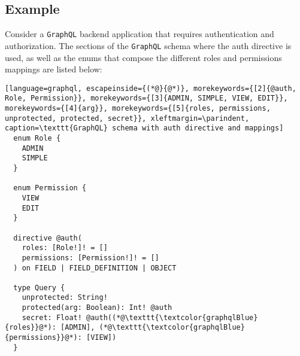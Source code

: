 \subsection{Example}
\label{subsec:corollary_projects_graphql_auth_diretive_example}

Consider a \texttt{GraphQL} backend application that requires authentication and
authorization. The sections of the \texttt{GraphQL} schema where the auth
directive is used, as well as the enums that compose the different roles and permissions
mappings are listed below:

\begin{lstlisting}[language=graphql, escapeinside={(*@}{@*)}, morekeywords={[2]{@auth, Role, Permission}}, morekeywords={[3]{ADMIN, SIMPLE, VIEW, EDIT}}, morekeywords={[4]{arg}}, morekeywords={[5]{roles, permissions, unprotected, protected, secret}}, xleftmargin=\parindent, caption=\texttt{GraphQL} schema with auth directive and mappings]
  enum Role {
    ADMIN
    SIMPLE
  }

  enum Permission {
    VIEW
    EDIT
  }

  directive @auth(
    roles: [Role!]! = []
    permissions: [Permission!]! = []
  ) on FIELD | FIELD_DEFINITION | OBJECT

  type Query {
    unprotected: String!
    protected(arg: Boolean): Int! @auth
    secret: Float! @auth((*@\texttt{\textcolor{graphqlBlue}{roles}}@*): [ADMIN], (*@\texttt{\textcolor{graphqlBlue}{permissions}}@*): [VIEW])
  }
\end{lstlisting}

